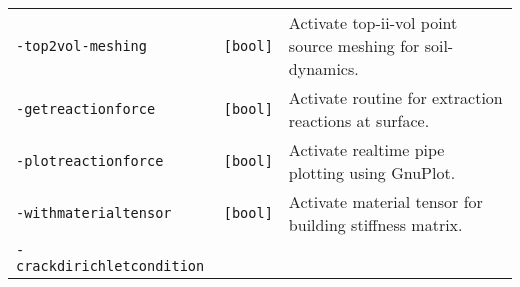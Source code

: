 \begin{longtable}[]{@{}lll@{}}
\begin{minipage}[t]{0.26\columnwidth}\raggedright\strut
\lstinline!-top2vol-meshing!\strut
\end{minipage} & \begin{minipage}[t]{0.09\columnwidth}\raggedright\strut
\lstinline![bool]!\strut
\end{minipage} & \begin{minipage}[t]{0.56\columnwidth}\raggedright\strut
Activate top-ii-vol point source meshing for soil-dynamics.\strut
\end{minipage}\tabularnewline
\begin{minipage}[t]{0.26\columnwidth}\raggedright\strut
\lstinline!-getreactionforce!\strut
\end{minipage} & \begin{minipage}[t]{0.09\columnwidth}\raggedright\strut
\lstinline![bool]!\strut
\end{minipage} & \begin{minipage}[t]{0.56\columnwidth}\raggedright\strut
Activate routine for extraction reactions at surface.\strut
\end{minipage}\tabularnewline
\begin{minipage}[t]{0.26\columnwidth}\raggedright\strut
\lstinline!-plotreactionforce!\strut
\end{minipage} & \begin{minipage}[t]{0.09\columnwidth}\raggedright\strut
\lstinline![bool]!\strut
\end{minipage} & \begin{minipage}[t]{0.56\columnwidth}\raggedright\strut
Activate realtime pipe plotting using GnuPlot.\strut
\end{minipage}\tabularnewline
\begin{minipage}[t]{0.26\columnwidth}\raggedright\strut
\lstinline!-withmaterialtensor!\strut
\end{minipage} & \begin{minipage}[t]{0.09\columnwidth}\raggedright\strut
\lstinline![bool]!\strut
\end{minipage} & \begin{minipage}[t]{0.56\columnwidth}\raggedright\strut
Activate material tensor for building stiffness matrix.\strut
\end{minipage}\tabularnewline
\begin{minipage}[t]{0.26\columnwidth}\raggedright\strut
\lstinline!-crackdirichletcondition!\strut
\end{minipage} & \begin{minipage}[t]{0.09\columnwidth}\raggedright\strut

\end{minipage}
\end{longtable}
